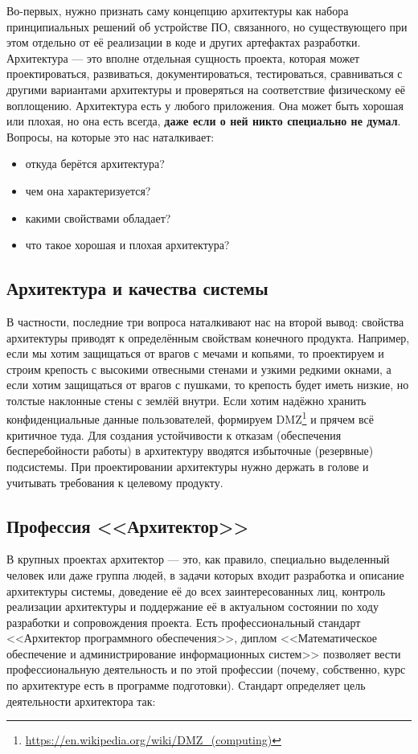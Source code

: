 \documentclass[a5paper]{article}
\begin{document}
Во-первых, нужно признать саму концепцию архитектуры как набора принципиальных решений об устройстве ПО, связанного, но существующего при этом отдельно от её реализации в коде и других артефактах разработки. Архитектура --- это вполне отдельная сущность проекта, которая может проектироваться, развиваться, документироваться, тестироваться, сравниваться с другими вариантами архитектуры и проверяться на соответствие физическому её воплощению. Архитектура есть у любого приложения. Она может быть хорошая или плохая, но она есть всегда, \textbf{даже если о ней никто специально не думал}. Вопросы, на которые это нас наталкивает:

\begin{itemize}
	\item откуда берётся архитектура?
	\item чем она характеризуется?
	\item какими свойствами обладает?
	\item что такое хорошая и плохая архитектура?
\end{itemize}

\subsection{Архитектура и качества системы}

В частности, последние три вопроса наталкивают нас на второй вывод: свойства архитектуры приводят к определённым свойствам конечного продукта. Например, если мы хотим защищаться от врагов с мечами и копьями, то проектируем и строим крепость с высокими отвесными стенами и узкими редкими окнами, а если хотим защищаться от врагов с пушками, то крепость будет иметь низкие, но толстые наклонные стены с землёй внутри. Если хотим надёжно хранить конфиденциальные данные пользователей, формируем DMZ\footnote{\url{https://en.wikipedia.org/wiki/DMZ_(computing)}} и прячем всё критичное туда. Для создания устойчивости к отказам (обеспечения бесперебойности работы) в архитектуру вводятся избыточные (резервные) подсистемы. При проектировании архитектуры нужно держать в голове и учитывать требования к целевому продукту.

\subsection{Профессия <<Архитектор>>}

В крупных проектах архитектор --- это, как правило, специально выделенный человек или даже группа людей, в задачи которых входит разработка и описание архитектуры системы, доведение её до всех заинтересованных лиц, контроль реализации архитектуры и поддержание её в актуальном состоянии по ходу разработки и сопровождения проекта. Есть профессиональный стандарт <<Архитектор программного обеспечения>>, диплом <<Математическое обеспечение и администрирование информационных систем>> позволяет вести профессиональную деятельность и по этой профессии (почему, собственно, курс по архитектуре есть в программе подготовки). Стандарт определяет цель деятельности архитектора так:
\end{document}
